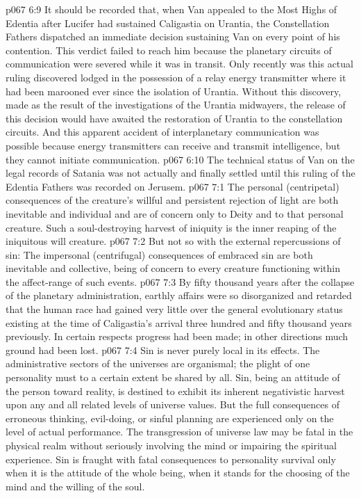 \vs p067 6:9 \pc It should be recorded that, when Van appealed to the Most Highs of Edentia after Lucifer had sustained Caligastia on Urantia, the Constellation Fathers dispatched an immediate decision sustaining Van on every point of his contention. This verdict failed to reach him because the planetary circuits of communication were severed while it was in transit. Only recently was this actual ruling discovered lodged in the possession of a relay energy transmitter where it had been marooned ever since the isolation of Urantia. Without this discovery, made as the result of the investigations of the Urantia midwayers, the release of this decision would have awaited the restoration of Urantia to the constellation circuits. And this apparent accident of interplanetary communication was possible because energy transmitters can receive and transmit intelligence, but they cannot initiate communication.
\vs p067 6:10 The technical status of Van on the legal records of Satania was not actually and finally settled until this ruling of the Edentia Fathers was recorded on Jerusem.
\vs p067 7:1 The personal (centripetal) consequences of the creature’s willful and persistent rejection of light are both inevitable and individual and are of concern only to Deity and to that personal creature. Such a soul\hyp{}destroying harvest of iniquity is the inner reaping of the iniquitous will creature.
\vs p067 7:2 But not so with the external repercussions of sin: The impersonal (centrifugal) consequences of embraced sin are both inevitable and collective, being of concern to every creature functioning within the affect\hyp{}range of such events.
\vs p067 7:3 By fifty thousand years after the collapse of the planetary administration, earthly affairs were so disorganized and retarded that the human race had gained very little over the general evolutionary status existing at the time of Caligastia’s arrival three hundred and fifty thousand years previously. In certain respects progress had been made; in other directions much ground had been lost.
\vs p067 7:4 Sin is never purely local in its effects. The administrative sectors of the universes are organismal; the plight of one personality must to a certain extent be shared by all. Sin, being an attitude of the person toward reality, is destined to exhibit its inherent negativistic harvest upon any and all related levels of universe values. But the full consequences of erroneous thinking, evil\hyp{}doing, or sinful planning are experienced only on the level of actual performance. The transgression of universe law may be fatal in the physical realm without seriously involving the mind or impairing the spiritual experience. Sin is fraught with fatal consequences to personality survival only when it is the attitude of the whole being, when it stands for the choosing of the mind and the willing of the soul.
